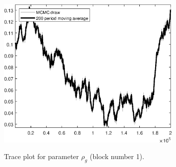 \begin{figure}[H]
\centering
  \includegraphics[width=0.8\textwidth]{BRS_sectoral_rest/graphs/TracePlot_rho_g_blck_1}\\
    \caption{Trace plot for parameter ${\rho_g}$ (block number 1).}
\end{figure}
